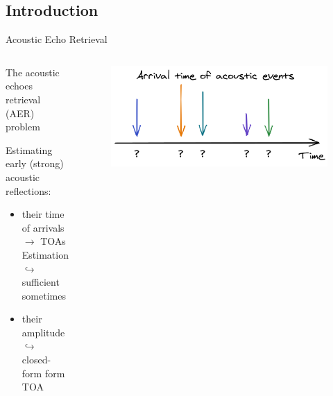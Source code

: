 \subsection{Introduction}

\begin{frame}{Acoustic Echo Retrieval}


    \begin{columns}[T,onlytextwidth]

        \begin{alertblock}{The acoustic echoes retrieval (AER) problem}

            \vspace{.1em}
            Estimating early (strong) acoustic reflections:
            \begin{itemize}
                \item their time of arrivals $\rightarrow$ TOAs Estimation
                \\$\hookrightarrow$ sufficient sometimes
                \item their amplitude
                \\$\hookrightarrow$ closed-form form TOA
            \end{itemize}
        \end{alertblock}

            \begin{figure}
                \centering
                \includegraphics[width=\textwidth]{./figures/arrivals.png}
            \end{figure}

    \end{columns}


\end{frame}
